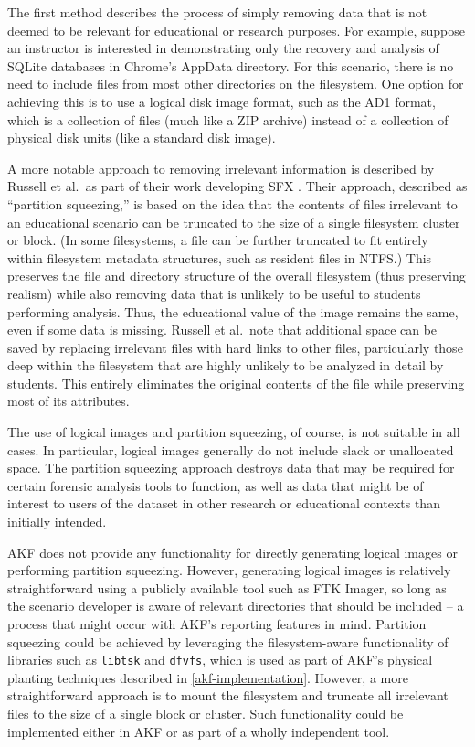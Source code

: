 \documentclass[letterpaper,12pt]{report}
\newcommand{\passthrough}[1]{#1}
\begin{document}
The first method describes the process of simply removing data that is
not deemed to be relevant for educational or research purposes. For
example, suppose an instructor is interested in demonstrating only the
recovery and analysis of SQLite databases in Chrome's AppData directory.
For this scenario, there is no need to include files from most other
directories on the filesystem. One option for achieving this is to use a
logical disk image format, such as the AD1 format, which is a collection
of files (much like a ZIP archive) instead of a collection of physical
disk units (like a standard disk image).

A more notable approach to removing irrelevant information is described
by Russell et al.~as part of their work developing SFX
\cite{russellForensicImageDescription2012}. Their approach,
described as ``partition squeezing,'' is based on the idea that the
contents of files irrelevant to an educational scenario can be truncated
to the size of a single filesystem cluster or block. (In some
filesystems, a file can be further truncated to fit entirely within
filesystem metadata structures, such as resident files in NTFS.) This
preserves the file and directory structure of the overall filesystem
(thus preserving realism) while also removing data that is unlikely to
be useful to students performing analysis. Thus, the educational value
of the image remains the same, even if some data is missing. Russell et
al.~note that additional space can be saved by replacing irrelevant
files with hard links to other files, particularly those deep within the
filesystem that are highly unlikely to be analyzed in detail by
students. This entirely eliminates the original contents of the file
while preserving most of its attributes.

The use of logical images and partition squeezing, of course, is not
suitable in all cases. In particular, logical images generally do not
include slack or unallocated space. The partition squeezing approach
destroys data that may be required for certain forensic analysis tools
to function, as well as data that might be of interest to users of the
dataset in other research or educational contexts than initially
intended.

AKF does not provide any functionality for directly generating logical
images or performing partition squeezing. However, generating logical
images is relatively straightforward using a publicly available tool
such as FTK Imager, so long as the scenario developer is aware of
relevant directories that should be included -- a process that might
occur with AKF's reporting features in mind. Partition squeezing could
be achieved by leveraging the filesystem-aware functionality of
libraries such as \passthrough{\lstinline!libtsk!} and
\passthrough{\lstinline!dfvfs!}, which is used as part of AKF's physical
planting techniques described in \autoref{akf-implementation}. However, a more straightforward approach is to
mount the filesystem and truncate all irrelevant files to the size of a
single block or cluster. Such functionality could be implemented either
in AKF or as part of a wholly independent tool.
\end{document}
